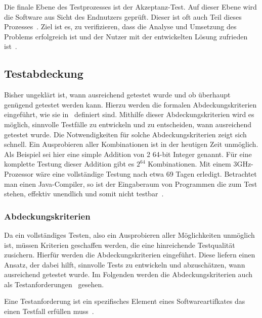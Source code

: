 Die finale Ebene des Testprozesses ist der Akzeptanz-Test.
Auf dieser Ebene wird die Software aus Sicht des Endnutzers geprüft.
Dieser ist oft auch Teil dieses Prozesses~\cite[vgl. S.6]{software-testing}.
Ziel ist es, zu verifizieren, dass die Analyse und Umsetzung des Problems erfolgreich ist und der Nutzer mit der entwickelten Lösung
zufrieden ist~\cite[vgl. S.6]{software-testing}.

\subsection{Testabdeckung}
\label{abdeck}

Bisher ungeklärt ist, wann ausreichend getestet wurde und ob überhaupt genügend getestet werden kann.
Hierzu werden die formalen Abdeckungskriterien eingeführt, wie sie in~\cite{software-testing} definiert sind.
Mithilfe dieser Abdeckungskriterien wird es möglich, sinnvolle Testfälle zu entwickeln und zu entscheiden, wann ausreichend getestet wurde.
Die Notwendigkeiten für solche Abdeckungskriterien zeigt sich schnell.
Ein Ausprobieren aller Kombinationen ist in der heutigen Zeit unmöglich.
Als Beispiel sei hier eine simple Addition von 2 64-bit Integer genannt.
Für eine komplette Testung dieser Addition gibt es $2^{64}$ Kombinationen.
Mit einem 3GHz-Prozessor wäre eine vollständige Testung nach etwa 69 Tagen erledigt.
Betrachtet man einen Java-Compiler, so ist der Eingaberaum von Programmen die zum Test stehen, effektiv unendlich und somit nicht testbar~\cite[vgl. 1.3 Coverage Criteria for Testing]{software-testing}.

\subsubsection{Abdeckungskriterien}

Da ein vollständiges Testen, also ein Ausprobieren aller Möglichkeiten unmöglich ist, müssen Kriterien geschaffen werden, die eine hinreichende Testqualität zusichern.
Hierfür werden die Abdeckungskriterien eingeführt.
Diese liefern einen Ansatz, der dabei hilft, sinnvolle Tests zu entwickeln und abzuschätzen, wann ausreichend getestet wurde.
Im Folgenden werden die Abdeckungskriterien auch als Testanforderungen~\cite[vgl. 1.3 Coverage Criteria for Testing]{software-testing} gesehen.

\begin{definition}
    Eine Testanforderung ist ein spezifisches Element eines Softwareartifkates das einen Testfall erfüllen muss~\cite[Def. 1.20]{software-testing}.
    \label{tr}
\end{definition}

